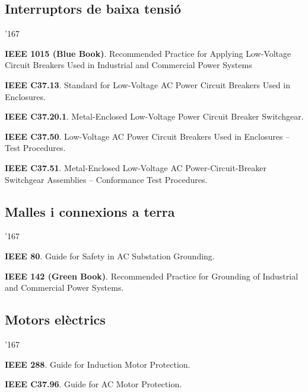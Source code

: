 \subsection*{Interruptors de baixa tensi\'{o}}
\begin{dinglist}{'167}
\item \textbf{IEEE 1015 (Blue Book)}. Recommended Practice for Applying Low-Voltage Circuit Breakers Used in Industrial and Commercial Power Systems 
     \item \textbf{IEEE C37.13}. Standard for Low-Voltage AC Power Circuit Breakers Used in Enclosures. 
    \item \textbf{IEEE C37.20.1}. Metal-Enclosed Low-Voltage Power Circuit Breaker Switchgear.
    \item \textbf{IEEE C37.50}. Low-Voltage AC Power Circuit Breakers Used in Enclosures -- Test Procedures.
    \item \textbf{IEEE C37.51}. Metal-Enclosed Low-Voltage AC Power-Circuit-Breaker Switchgear Assemblies -- Conformance Test Procedures.
\end{dinglist}


\subsection*{Malles i connexions a terra}
\begin{dinglist}{'167}
    \item \textbf{IEEE 80}. Guide for Safety in AC Substation Grounding.
    \item \textbf{IEEE 142 (Green Book)}. Recommended Practice for Grounding of Industrial and Commercial Power Systems.
\end{dinglist}

\subsection*{Motors el\`{e}ctrics}
\begin{dinglist}{'167}
    \item \textbf{IEEE 288}. Guide for Induction Motor Protection.
    \item \textbf{IEEE C37.96}. Guide for AC Motor Protection.
\end{dinglist}


